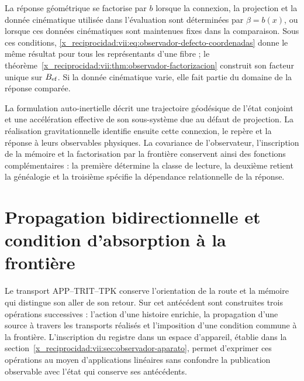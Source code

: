 La réponse géométrique se factorise par \(b\) lorsque la connexion,
la projection et la donnée cinématique utilisée dans l'évaluation sont
déterminées par \(\beta=b(x)\), ou lorsque ces données cinématiques sont
maintenues fixes dans la comparaison. Sous ces conditions,
\eqref{x_reciprocidad:vii:eq:observador-defecto-coordenadas} donne le même résultat
pour tous les représentants d'une fibre ; le
théorème~\ref{x_reciprocidad:vii:thm:observador-factorizacion} construit son facteur
unique sur \(B_{\rm ef}\). Si la donnée cinématique varie, elle
fait partie du domaine de la réponse comparée.

La formulation auto-inertielle décrit une trajectoire géodésique de
l'état conjoint et une accélération effective de son sous-système due
au défaut de projection. La réalisation gravitationnelle identifie
ensuite cette connexion, le repère et la réponse à leurs observables
physiques. La covariance de l'observateur, l'inscription de la mémoire et
la factorisation par la frontière conservent ainsi des fonctions complémentaires :
la première détermine la classe de lecture, la deuxième retient la
généalogie et la troisième spécifie la dépendance relationnelle de la
réponse.




\chapter{Propagation bidirectionnelle et condition d'absorption à la frontière}
\label{x_reciprocidad:vii:sec:propagacion-bidireccional}

Le transport APP--TRIT--TPK conserve l'orientation de la route et la mémoire qui distingue son aller de son retour. Sur cet antécédent sont construites trois opérations successives : l'action d'une histoire enrichie, la propagation d'une source à travers les transports réalisés et l'imposition d'une condition commune à la frontière. L'inscription du registre dans un espace d'appareil, établie dans la section~\ref{x_reciprocidad:vii:sec:observador-aparato}, permet d'exprimer ces opérations au moyen d'applications linéaires sans confondre la publication observable avec l'état qui conserve ses antécédents.

